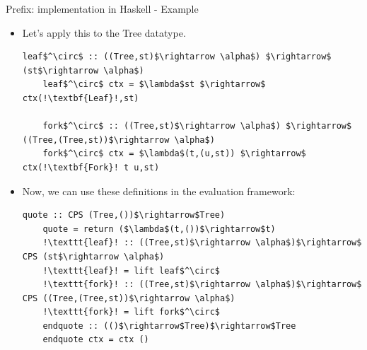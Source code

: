 \documentclass[10pt]{beamer}
\begin{document}
\begin{frame}[fragile]{Prefix: implementation in Haskell - Example}

\begin{itemize}

\item Let's apply this to the Tree datatype.

\begin{lstlisting}[mathescape=true, escapechar=!]
	leaf$^\circ$ :: ((Tree,st)$\rightarrow \alpha$) $\rightarrow$ (st$\rightarrow \alpha$)
	leaf$^\circ$ ctx = $\lambda$st $\rightarrow$ ctx(!\textbf{Leaf}!,st)
	
	fork$^\circ$ :: ((Tree,st)$\rightarrow \alpha$) $\rightarrow$ ((Tree,(Tree,st))$\rightarrow \alpha$)
	fork$^\circ$ ctx = $\lambda$(t,(u,st)) $\rightarrow$ ctx(!\textbf{Fork}! t u,st)
\end{lstlisting}

\item Now, we can use these definitions in the evaluation framework:

\begin{lstlisting}[mathescape=true, escapechar=!]
	quote :: CPS (Tree,())$\rightarrow$Tree)
	quote = return ($\lambda$(t,())$\rightarrow$t)
	!\texttt{leaf}! :: ((Tree,st)$\rightarrow \alpha$)$\rightarrow$ CPS (st$\rightarrow \alpha$)
	!\texttt{leaf}! = lift leaf$^\circ$
	!\texttt{fork}! :: ((Tree,st)$\rightarrow \alpha$)$\rightarrow$ CPS ((Tree,(Tree,st))$\rightarrow \alpha$)
	!\texttt{fork}! = lift fork$^\circ$
	endquote :: (()$\rightarrow$Tree)$\rightarrow$Tree
	endquote ctx = ctx ()
\end{lstlisting}

\end{itemize}

\end{frame}
\end{document}
